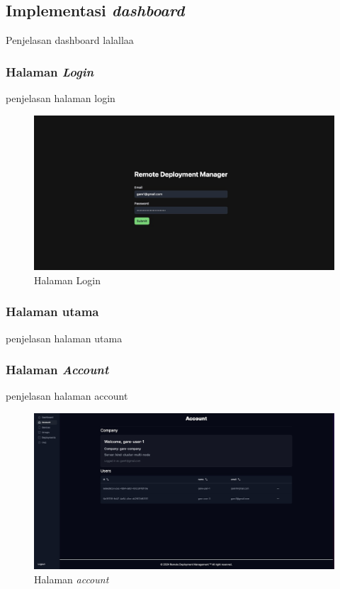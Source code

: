 \subsection{Implementasi \textit{dashboard}}
Penjelasan dashboard lalallaa

\subsubsection{Halaman \textit{Login}}
penjelasan halaman login

\begin{figure}[ht]
  \centering
  \includegraphics[width=1\textwidth]{resources/chapter-4/dashboard/login-page.jpg}
  \caption{Halaman Login}
  \label{fig:halaman-login}
\end{figure}

\subsubsection{Halaman utama}
penjelasan halaman utama

\subsubsection{Halaman \textit{Account}}
penjelasan halaman account

\begin{figure}
  \centering
  \includegraphics[width=1\textwidth]{resources/chapter-4/dashboard/account-page.jpg}
  \caption{Halaman \textit{account}}
  \label{fig:halaman-account}
\end{figure}

